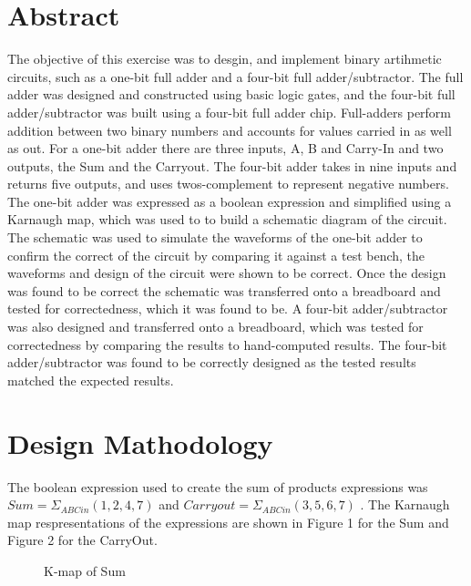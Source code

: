 \documentclass[CMPE]{KGCOEReport}
\begin{document}
\maketitle

\section*{Abstract}
The objective of this exercise was to desgin, and implement binary artihmetic circuits, such as a one-bit full adder and a four-bit full adder/subtractor. The full adder was designed and constructed using basic logic gates, and the four-bit full adder/subtractor was built using a four-bit full adder chip. Full-adders perform addition between two binary numbers and accounts for values carried in as well as out. For a one-bit adder there are three inputs, A, B and Carry-In and two outputs, the Sum and the Carryout. The four-bit adder takes in nine inputs and returns five outputs, and uses twos-complement to represent negative numbers. The one-bit adder was expressed as a boolean expression and simplified using a Karnaugh map, which was used to to build a schematic diagram of the circuit. The schematic was used to simulate the waveforms of the one-bit adder to confirm the correct of the circuit by comparing it against a test bench, the waveforms and design of the circuit were shown to be correct. Once the design was found to be correct the schematic was transferred onto a breadboard and tested for correctedness, which it was found to be. A four-bit adder/subtractor was also designed and transferred onto a breadboard, which was tested for correctedness by comparing the results to hand-computed results. The four-bit adder/subtractor was found to be correctly designed as the tested results matched the expected results.

\section*{Design Mathodology}
The boolean expression used to create the sum of products expressions was $Sum = \Sigma_{ABCin}(1,2,4,7)$ and $Carryout = \Sigma_{ABCin}(3,5,6,7)$ . The Karnaugh map respresentations of the expressions are shown in Figure 1 for the Sum and Figure 2 for the CarryOut. 

\begin{figure}[H]
	\centering
	\begin{Karnaugh3Var}[A][B][Cin]
		\end{Karnaugh3Var}
		\caption{K-map of Sum}
		\label{fig:Figure 1}
\end{figure}
\end{document}
